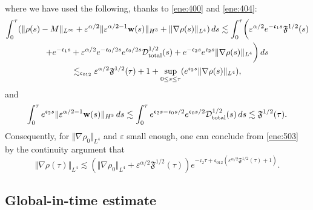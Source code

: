 \documentclass[11pt]{article}
\theoremstyle{plain}
\theoremstyle{definition}
\theoremstyle{remark}
\newcommand{\mrm}[1]{\mathrm{#1}}
\renewcommand{\vec}[1]{{\bf #1}}
\newcommand{\norm}[2]{\Vert #1 \Vert_{#2}}
\numberwithin{equation}{section}
\begin{document}
where we have used the following, thanks to \eqref{ene:400} and \eqref{ene:404}: 
\begin{equation}
    \label{ene:504}
    \begin{gathered}
        \int_0^\tau (\norm{\rho(s) - M}{L^\infty} + \varepsilon^{\alpha/2}\norm{\varepsilon^{\alpha/2-1}\vec w(s)}{H^3} + \norm{\nabla \rho (s)}{L^4} ) \,ds \lesssim \int_0^\tau \biggl( \varepsilon^{\alpha/2} e^{-\mathfrak c_1 s} \mathfrak F^{1/2}(s) \\
        + e^{-\mathfrak c_1 s} + \varepsilon^{\alpha/2} e^{-\mathfrak c_0/2 s} e^{\mathfrak c_0/2 s} \mathcal D_\mrm{total}^{1/2}(s) + e^{-\mathfrak c_2 s} e^{\mathfrak c_2 s} \norm{\nabla\rho(s)}{L^4} \biggr) \,ds \\
        \lesssim_{\mathfrak{c}_{012}} \varepsilon^{\alpha/2} \mathfrak F^{1/2}(\tau) + 1 + \sup_{0\leq s \leq \tau} (e^{\mathfrak c_2 s} \norm{\nabla\rho(s)}{L^4}),
    \end{gathered}
\end{equation}
and 
\begin{equation}
    \label{ene:505}
    \int_0^\tau e^{\mathfrak c_2 s} \norm{\varepsilon^{\alpha/2-1}\vec w(s)}{H^3} \,ds \lesssim \int_0^\tau e^{\mathfrak c_2 s - \mathfrak c_0 s/2} e^{\mathfrak c_0 s/2} \mathcal D_\mrm{total}^{1/2} (s)\,ds \lesssim \mathfrak F^{1/2}(\tau). 
\end{equation}
Consequently, for $ \norm{\nabla \rho_0}{L^4} $ and $ \varepsilon $ small enough, one can conclude from \eqref{ene:503} by the continuity argument that
\begin{equation}
    \label{ene:506}
    \norm{\nabla \rho(\tau)}{L^4} \lesssim (\norm{\nabla \rho_0}{L^4} + \varepsilon^{\alpha/2} \mathfrak F^{1/2}(\tau) ) e^{-\mathfrak c_2 \tau + \mathfrak c_{012} (\varepsilon^{\alpha/2} \mathfrak F^{1/2}(\tau) + 1)}.
\end{equation}


\subsection{Global-in-time estimate}
\label{sec:global-estimate}
\end{document}
